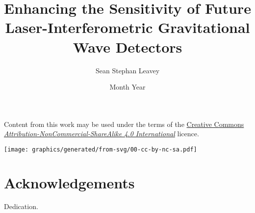 \documentclass[twoside,nogutter]{glasgowthesis}
\begin{document}

\title{Enhancing the Sensitivity of Future Laser-Interferometric Gravitational Wave Detectors}
\author{Sean Stephan Leavey}
\date{Month Year}

\maketitle

\cleardoublepage


 

\newpage




\newpage
{}
\vspace*{2.75in}
\noindent Content from this work may be used under the terms of the \href{https://creativecommons.org/licenses/by-nc-sa/4.0/}{Creative Commons \emph{Attribution-NonCommercial-ShareAlike 4.0 International}} licence.
\begin{center}
  \texttt{[image: graphics/generated/from-svg/00-cc-by-nc-sa.pdf]}
\end{center}

\newpage
\renewcommand{\contentsname}{Table of contents}
\tableofcontents
{}

\listoftables
{}

\listoffigures
{}

\cleardoublepage
\section*{\label{c:intro:credits}Acknowledgements}


\cleardoublepage
{}
\vspace*{1.75in}
\begin{flushright} Dedication.\end{flushright}


\mainmatter









\appendix




\backmatter

\printglossary

\printbibliography[heading=bibintoc]
\end{document}
